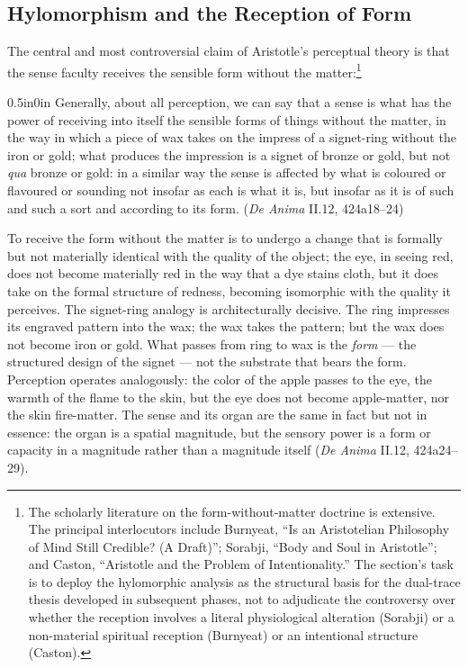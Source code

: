 \subsection{Hylomorphism and the Reception of Form}

The central and most controversial claim of Aristotle's perceptual theory is that the sense faculty receives the sensible form without the matter:\footnote{The scholarly literature on the form-without-matter doctrine is extensive. The principal interlocutors include Burnyeat, ``Is an Aristotelian Philosophy of Mind Still Credible? (A Draft)''; Sorabji, ``Body and Soul in Aristotle''; and Caston, ``Aristotle and the Problem of Intentionality.'' The section's task is to deploy the hylomorphic analysis as the structural basis for the dual-trace thesis developed in subsequent phases, not to adjudicate the controversy over whether the reception involves a literal physiological alteration (Sorabji) or a non-material spiritual reception (Burnyeat) or an intentional structure (Caston).}
\begin{adjustwidth}{0.5in}{0in}
Generally, about all perception, we can say that a sense is what has the power of receiving into itself the sensible forms of things without the matter, in the way in which a piece of wax takes on the impress of a signet-ring without the iron or gold; what produces the impression is a signet of bronze or gold, but not \textit{qua} bronze or gold: in a similar way the sense is affected by what is coloured or flavoured or sounding not insofar as each is what it is, but insofar as it is of such and such a sort and according to its form. (\textit{De Anima} II.12, 424a18--24)
\end{adjustwidth}
To receive the form without the matter is to undergo a change that is formally but not materially identical with the quality of the object; the eye, in seeing red, does not become materially red in the way that a dye stains cloth, but it does take on the formal structure of redness, becoming isomorphic with the quality it perceives. The signet-ring analogy is architecturally decisive. The ring impresses its engraved pattern into the wax; the wax takes the pattern; but the wax does not become iron or gold. What passes from ring to wax is the \textit{form} --- the structured design of the signet --- not the substrate that bears the form. Perception operates analogously: the color of the apple passes to the eye, the warmth of the flame to the skin, but the eye does not become apple-matter, nor the skin fire-matter. The sense and its organ are the same in fact but not in essence: the organ is a spatial magnitude, but the sensory power is a form or capacity in a magnitude rather than a magnitude itself (\textit{De Anima} II.12, 424a24--29).

